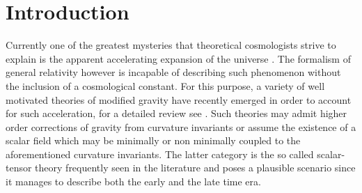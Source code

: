 \documentclass[aps,prd,twocolumn,groupedaddress,showpacs,nofootinbib,amssymb]{revtex4-2}
\begin{document}
\section{Introduction}
Currently one of the greatest mysteries that theoretical cosmologists strive to explain is the apparent accelerating expansion of the universe \cite{Riess:1998cb}. The formalism of general relativity however is incapable of describing such phenomenon without the inclusion of a cosmological constant. For this purpose, a variety of well motivated theories of modified gravity have recently emerged in order to account for such acceleration, for a detailed review see \cite{Nojiri:2019fft,Delubac:2014aqe,Sahni:2014ooa,Nojiri:2017ncd,Nojiri:2009kx,Capozziello:2011et,Capozziello:2010zz,Nojiri:2006ri,Nojiri:2010wj,delaCruzDombriz:2012xy,Olmo:2011uz,Nojiri:2003ft,Nojiri:2007as,Nojiri:2007cq,Cognola:2007zu,Nojiri:2006gh,Appleby:2007vb,Zhong:2018tqn,Odintsov:2020qyw,Li:2007jm,Nojiri:2005jg,Nojiri:2005am,Cognola:2006eg,Elizalde:2010jx,Izumi:2014loa,Oikonomou:2016rrv,Kleidis:2017ftt,Escofet:2015gpa,Makarenko:2017vuk,Makarenko:2016jsy,Navo:2020eqt,Bajardi:2020osh,Capozziello:2019wfi,Benetti:2018zhv,Clifton:2006kc,Bogdanos:2009tn,Capozziello:2004us,Barrow:1988xh,Bamba:2009uf,DeLaurentis:2015fea,DeFelice:2010sh,delaCruzDombriz:2011wn,Elizalde:2010ts,Odintsov:2020nwm,Bamba:2012qi}. Such theories may admit higher order corrections of gravity from curvature invariants or assume the existence of a scalar field which may be minimally or non minimally coupled to the aforementioned curvature invariants. The latter category is the so called scalar-tensor theory frequently seen in the literature and poses a plausible scenario since it manages to describe both the early and the late time era.
\end{document}
